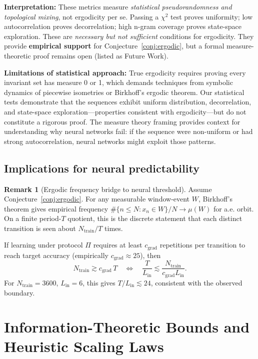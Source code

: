 \documentclass[11pt]{article}
\theoremstyle{plain}
\theoremstyle{definition}
\newtheorem{remark}[theorem]{Remark}
\begin{document}
\textbf{Interpretation:} These metrics measure \emph{statistical pseudorandomness and topological mixing}, not ergodicity per se. Passing a $\chi^2$ test proves uniformity; low autocorrelation proves decorrelation; high n-gram coverage proves state-space exploration. These are \emph{necessary but not sufficient} conditions for ergodicity. They provide \textbf{empirical support} for Conjecture~\ref{conj:ergodic}, but a formal measure-theoretic proof remains open (listed as Future Work).

\textbf{Limitations of statistical approach:} True ergodicity requires proving every invariant set has measure 0 or 1, which demands techniques from symbolic dynamics of piecewise isometries or Birkhoff's ergodic theorem. Our statistical tests demonstrate that the sequences exhibit uniform distribution, decorrelation, and state-space exploration—properties consistent with ergodicity—but do not constitute a rigorous proof. The measure theory framing provides context for understanding why neural networks fail: if the sequence were non-uniform or had strong autocorrelation, neural networks might exploit those patterns.

\subsection{Implications for neural predictability}

\begin{remark}[Ergodic frequency bridge to neural threshold]
\label{rem:ergodic_bridge}
Assume Conjecture~\ref{conj:ergodic}. For any measurable window-event $W$, Birkhoff's theorem gives empirical frequency $\#\{n\le N: x_n\in W\}/N \to \mu(W)$ for a.e. orbit. On a finite period-$T$ quotient, this is the discrete statement that each distinct transition is seen about $N_{\mathrm{train}}/T$ times.

If learning under protocol $\Pi$ requires at least $c_{\mathrm{grad}}$ repetitions per transition to reach target accuracy (empirically $c_{\mathrm{grad}}\approx 25$), then
\[
N_{\mathrm{train}} \gtrsim c_{\mathrm{grad}}\,T
\quad\Longleftrightarrow\quad
\frac{T}{L_{\mathrm{in}}}\lesssim \frac{N_{\mathrm{train}}}{c_{\mathrm{grad}}L_{\mathrm{in}}}.
\]
For $N_{\mathrm{train}}=3600$, $L_{\mathrm{in}}=6$, this gives $T/L_{\mathrm{in}}\lesssim 24$, consistent with the observed boundary.
\end{remark}

\section{Information-Theoretic Bounds and Heuristic Scaling Laws}
\label{sec:neural_theory}
\end{document}
